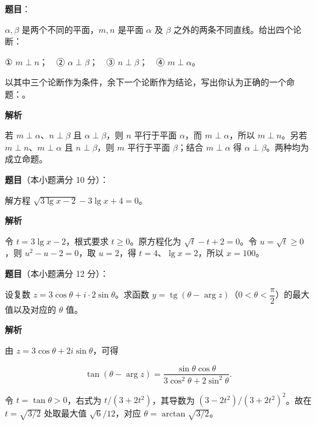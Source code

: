 \begin{answer}

\textbf{题目}：

$\alpha,\beta$ 是两个不同的平面，$m,n$ 是平面 $\alpha$ 及 $\beta$ 之外的两条不同直线。给出四个论断：

① $m\perp n$；　② $\alpha\perp\beta$；　③ $n\perp\beta$；　④ $m\perp\alpha$。

以其中三个论断作为条件，余下一个论断作为结论，写出你认为正确的一个命题：\gkblank{}。

\textbf{解析}

若 $m\perp\alpha$、$n\perp\beta$ 且 $\alpha\perp\beta$，则 $n$ 平行于平面 $\alpha$，而 $m\perp\alpha$，所以 $m\perp n$。另若 $m\perp n$、$m\perp\alpha$ 且 $n\perp\beta$，则 $m$ 平行于平面 $\beta$；结合 $m\perp\alpha$ 得 $\alpha\perp\beta$。两种均为成立命题。


\end{answer}
\begin{answer}

\textbf{题目}（本小题满分 10 分）：

解方程 $\sqrt{3\lg x-2}-3\lg x+4=0$。

\textbf{解析}

令 $t=3\lg x-2$，根式要求 $t\ge0$。原方程化为 $\sqrt t-t+2=0$。令 $u=\sqrt t\ge0$，则 $u^2-u-2=0$，取 $u=2$，得 $t=4$、$\lg x=2$，所以 $x=100$。


\end{answer}
\begin{answer}

\textbf{题目}（本小题满分 12 分）：

设复数 $z=3\cos\theta+i\cdot2\sin\theta$。求函数 $y=\operatorname{tg}(\theta-\arg z)$（$0<\theta<\dfrac\pi2$）的最大值以及对应的 $\theta$ 值。

\textbf{解析}

由 $z=3\cos\theta+2i\sin\theta$，可得

\nopagebreak[4]
\[
\tan(\theta-\arg z)=\frac{\sin\theta\cos\theta}{3\cos^2\theta+2\sin^2\theta}.
\]

令 $t=\tan\theta>0$，右式为 $t/(3+2t^2)$，其导数为 $(3-2t^2)/(3+2t^2)^2$。故在 $t=\sqrt{3/2}$ 处取最大值 $\sqrt6/12$，对应 $\theta=\arctan\sqrt{3/2}$。


\end{answer}

